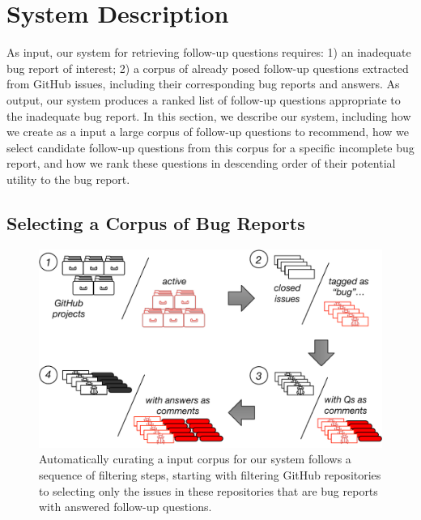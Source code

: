 \section{System Description}

As input, our system for retrieving follow-up questions requires: 1) an inadequate bug
report of interest; 2) a corpus of already posed follow-up questions extracted
from GitHub issues, including their corresponding bug reports and answers. As output, our system
produces a ranked list of follow-up questions appropriate to the inadequate bug report.
In this section, we describe our system, including how we create as a input
a large corpus of follow-up questions to recommend, how we select candidate follow-up questions from
this corpus for a specific incomplete bug report, and how we rank these questions in descending order of
their potential utility to the bug report.

\subsection{Selecting a Corpus of Bug Reports}


\begin{figure}[ht]
\centering
\includegraphics[width=0.99\linewidth]{figures/pipeline.pdf}
\caption{Automatically curating a input corpus for our system follows a sequence of filtering steps, starting with filtering
GitHub repositories to selecting only the issues in these repositories that are bug reports with answered follow-up questions.}
\label{fig:sample_br}
\end{figure}

